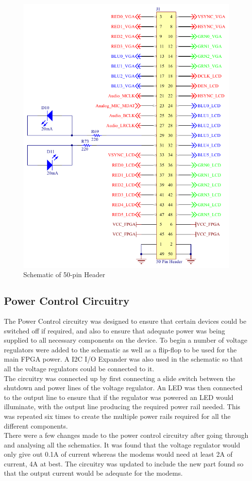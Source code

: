\begin{figure}
	\includegraphics[width=0.5\linewidth]{Figures/50_pin_header.pdf}\centering
	\caption{Schematic of 50-pin Header}
	\label{fig:header}
\end{figure}

\subsection{Power Control Circuitry}
\label{chap:batt}
	The Power Control circuitry was designed to ensure that certain devices could be switched off if required, and also to ensure that adequate power was being supplied to all necessary components on the device. 
To begin a number of voltage regulators were added to the schematic as well as a flip-flop to be used for the main FPGA power. 
A I2C I/O Expander was also used in the schematic so that all the voltage regulators could be connected to it.\\

	The circuitry was connected up by first connecting a slide switch between the shutdown and power lines of the voltage regulator. 
An LED was then connected to the output line to ensure that if the regulator was powered an LED would illuminate, with the output line producing the required power rail needed. 
This was repeated six times to create the multiple power rails required for all the different components.\\

	There were a few changes made to the power control circuitry after going through and analysing all the schematics. 
It was found that the voltage regulator would only give out 0.1A of current whereas the modems would need at least 2A of current, 4A at best. 
The circuitry was updated to include the new part found so that the output current would be adequate for the modems. \\

